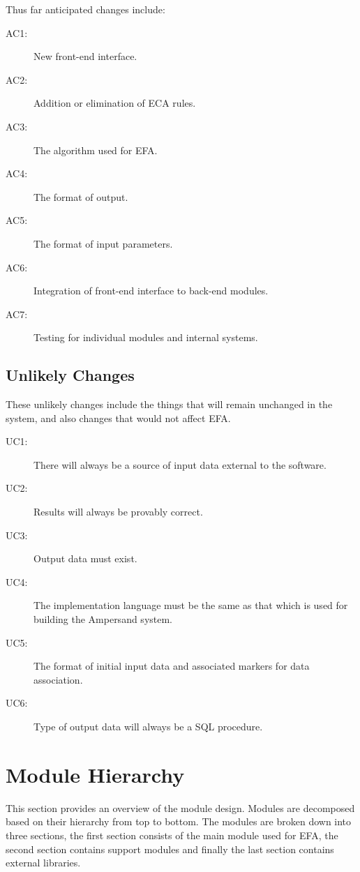 \documentclass[12pt, svgnames]{article}
\begin{document}
Thus far anticipated changes include:

\begin{description}
    \item[AC1:] New front-end interface.
    \item[AC2:] Addition or elimination of ECA rules.
    \item[AC3:] The algorithm used for EFA.
    \item[AC4:] The format of output.
    \item[AC5:] The format of input parameters.
    \item[AC6:] Integration of front-end interface to back-end modules.
    \item[AC7:] Testing for individual modules and internal systems.
    
\end{description}

\subsection{Unlikely Changes} 

These unlikely changes include the things that will remain unchanged in the 
system, and also changes that would not affect EFA. 

\begin{description}
    \item[UC1:] There will always be a source of input data external to the 
    software.
    \item[UC2:] Results will always be provably correct.
    \item[UC3:] Output data must exist.
    \item[UC4:] The implementation language must be the same as that which is 
    used for building the Ampersand system.
    \item[UC5:] The format of initial input data and associated markers for 
    data association.
    \item[UC6:] Type of output data will always be a SQL procedure.
\end{description}

\section{Module Hierarchy}
This section provides an overview of the module design. Modules are decomposed 
based on their hierarchy from top to bottom. The modules are broken down into 
three sections, the first section consists of the main module used for EFA, 
the second section contains support modules and finally the last section
contains external libraries.
\end{document}
